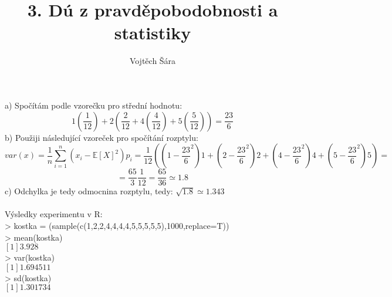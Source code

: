 \documentclass{article}
\title{3. Dú z pravděpobodobnosti a statistiky}
\author{Vojtěch Šára}
\begin{document}
\maketitle
a) Spočítám podle vzorečku pro střední hodnotu:
$$1(\frac{1}{12})+ 2(\frac{2}{12} + 4(\frac{4}{12}) + 5(\frac{5}{12})) = \frac{23}{6}$$
b) Použiji následující vzoreček pro spočítání rozptylu:
$$var(x) = \frac{1}{n}\sum_{i = 1}^{n}(x_{i}-\mathbb{E}[X]^{2})p_{i} = \frac{1}{12}((1-\frac{23}{6}^{2})1 + (2-\frac{23}{6}^{2})2 + (4-\frac{23}{6}^{2})4 + (5-\frac{23}{6}^{2})5) = $$
$$ = \frac{65}{3}\frac{1}{12} = \frac{65}{36} \simeq 1.8$$
c) Odchylka je tedy odmocnina rozptylu, tedy: $\sqrt{1.8} \simeq 1.343$\\\\


Výsledky experimentu v R:\\
> kostka = (sample(c(1,2,2,4,4,4,4,5,5,5,5,5),1000,replace=T))\\
> mean(kostka)\\
$[1] 3.928$\\
> var(kostka)\\
$[1] 1.694511$\\
> sd(kostka)\\
$[1] 1.301734$\\
\end{document}
